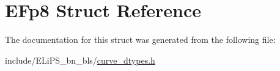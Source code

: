 \hypertarget{struct_e_fp8}{}\section{E\+Fp8 Struct Reference}
\label{struct_e_fp8}


The documentation for this struct was generated from the following file\+:\begin{DoxyCompactItemize}
\item 
include/\+E\+Li\+P\+S\+\_\+bn\+\_\+bls/\hyperlink{curve__dtypes_8h}{curve\+\_\+dtypes.\+h}\end{DoxyCompactItemize}
